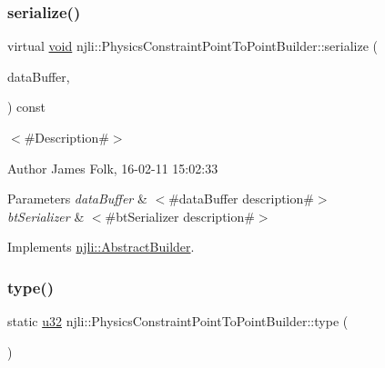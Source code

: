 \subsubsection{\texorpdfstring{serialize()}{serialize()}}
{\footnotesize\ttfamily virtual \mbox{\hyperlink{_thread_8h_af1e856da2e658414cb2456cb6f7ebc66}{void}} njli\+::\+Physics\+Constraint\+Point\+To\+Point\+Builder\+::serialize (\begin{DoxyParamCaption}\item[{\mbox{\hyperlink{_thread_8h_af1e856da2e658414cb2456cb6f7ebc66}{void}} $\ast$}]{data\+Buffer,  }\item[{bt\+Serializer $\ast$}]{ }\end{DoxyParamCaption}) const\hspace{0.3cm}{\ttfamily [virtual]}}



$<$\#\+Description\#$>$ 

\begin{DoxyAuthor}{Author}
James Folk, 16-\/02-\/11 15\+:02\+:33
\end{DoxyAuthor}

\begin{DoxyParams}{Parameters}
{\em data\+Buffer} & $<$\#data\+Buffer description\#$>$ \\
\hline
{\em bt\+Serializer} & $<$\#bt\+Serializer description\#$>$ \\
\hline
\end{DoxyParams}


Implements \mbox{\hyperlink{classnjli_1_1_abstract_builder_ab66b774e02ccb9da554c9aab7fa6d981}{njli\+::\+Abstract\+Builder}}.

\mbox{\label{classnjli_1_1_physics_constraint_point_to_point_builder_a883748c7fa30b1c3f4e340e7f4aaf7d2}} 
\subsubsection{\texorpdfstring{type()}{type()}}
{\footnotesize\ttfamily static \mbox{\hyperlink{_util_8h_a10e94b422ef0c20dcdec20d31a1f5049}{u32}} njli\+::\+Physics\+Constraint\+Point\+To\+Point\+Builder\+::type (\begin{DoxyParamCaption}{ }\end{DoxyParamCaption})\hspace{0.3cm}{\ttfamily [static]}}

